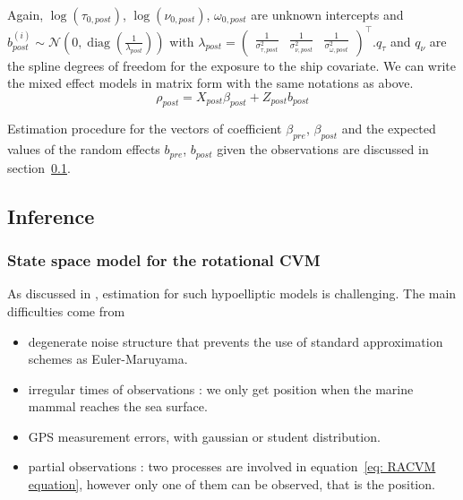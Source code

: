 \documentclass[11pt]{article}
\DeclareMathOperator{\diag}{diag}
\newcommand {\1}{\mathbb{1}}
\begin{document}
Again, $\log(\tau_{0,post})$, $\log(\nu_{0,post})$, $\omega_{0,post}$ are unknown intercepts and $b^{(i)}_{post} \sim \mathcal{N}\left( 0, \diag\left(\frac{1}{\lambda_{post}}\right)\right)$ with $\lambda_{post}=\begin{pmatrix} \frac{1}{\sigma_{\tau,post}^2} & \frac{1}{\sigma_{\nu,post}^2} & \frac{1}{\sigma_{\omega,post}^2} \end{pmatrix}^\top$.$q_{\tau}$ and $q_{\nu}$ are the spline degrees of freedom for the exposure to the ship covariate.
We can write the mixed effect models in matrix form with the same notations as above.
\begin{equation}
	\rho_{post}
	=X_{post} \beta_{post}
	+Z_{post} b_{post}
\end{equation}

Estimation procedure for the vectors of coefficient $\beta_{pre}$, $\beta_{post}$ and the expected values of the random effects $b_{pre}$, $b_{post}$ given the observations are discussed in section~\ref{section: inference}.\\


\subsection{Inference}
\label{section: inference}

\subsubsection{State space model for the rotational CVM}

As discussed in \cite{ditlevsen_hypoelliptic_2019}, estimation for such hypoelliptic models is challenging. The main difficulties come from
\begin{itemize}
	\item degenerate noise structure that prevents the use of standard approximation schemes as Euler-Maruyama.
	 \item irregular times of observations : we only get position when the marine mammal reaches the sea surface.
	 \item GPS measurement errors, with gaussian or student distribution.
	 \item partial observations : two processes are involved in equation~\ref{eq: RACVM equation}, however only one of them can be observed, that is the position.
\end{itemize}
\end{document}
